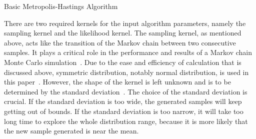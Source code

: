\begin{algorithm}[bp!]
\BlankLine


\caption{Basic Metropolis-Hastings Algorithm}
\end{algorithm}
\clearpage
There are two required kernels for the input algorithm parameters, namely the sampling kernel and the likelihood kernel. The sampling kernel, as mentioned above, acts like the transition of the Markov chain between two consecutive samples. It plays a critical role in the performance and results of a Markov chain Monte Carlo simulation~\cite{mcmc_practice}. Due to the ease and efficiency of calculation that is discussed above, symmetric distribution, notably normal distribution, is used in this paper~\cite{gaussian_distribution_property}. However, the shape of the kernel is left unknown and is to be determined by the standard deviation~\cite{normal}. The choice of the standard deviation is crucial. If the standard deviation is too wide, the generated samples will keep getting out of bounds. If the standard deviation is too narrow, it will take too long time to explore the whole distribution range, because it is more likely that the new sample generated is near the mean. 

